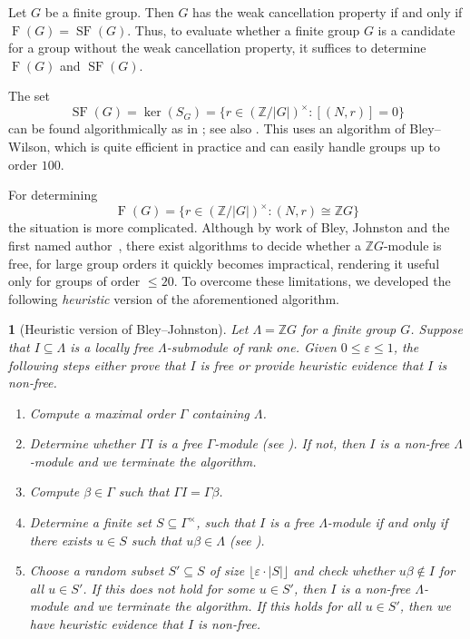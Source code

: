 \documentclass[11pt,leqno,a4paper]{amsart}
\newcommand{\Z}{\mathbb{Z}}
\DeclareMathOperator{\SF}{SF}
\DeclareMathOperator{\FF}{F}
\newcommand{\customthmname}{}
\newtheorem{innercustomthm}[thm]{\customthmname}
\newenvironment{customtheorem}[1]
  {\renewcommand{\customthmname}{#1}\begin{innercustomthm}}
  {\end{innercustomthm}}
\theoremstyle{definition}
\theoremstyle{remark}
\theoremstyle{custom}
\renewcommand{\l}{\Lambda}
\newenvironment{clist}[1]
{\begin{enumerate}[\normalfont #1]}
{\end{enumerate}}
\begin{document}
Let $G$ be a finite group.
Then $G$ has the weak cancellation property if and only if $\FF(G) = \SF(G)$.
Thus, to evaluate whether a finite group $G$ is a candidate for a group without the weak cancellation property, it suffices to determine $\FF(G)$ and $\SF(G)$.

The set
\[ \SF(G) = \ker(S_G) = \{ r \in (\Z/|G|)^\times : [(N,r)] = 0 \} \]
can be found algorithmically as
in ; see also .
This uses an algorithm of Bley--Wilson, which is quite efficient in practice and can easily handle groups up to order $100$.

For determining 
\[ \FF(G) = \{ r \in (\Z/|G|)^\times : (N,r) \cong \Z G\} \] 
the situation is more complicated.
Although by work of Bley, Johnston and the first named author~\cite{MR2422318,MR2813368,MR4136552}, there exist algorithms to decide whether a $\Z G$-module is free, for large group orders it quickly becomes impractical, rendering it useful only for groups of order $\leq 20$.
To overcome these limitations, we developed the following \textit{heuristic} version of the aforementioned algorithm.

\begin{customtheorem}{Algorithm}[Heuristic version of Bley--Johnston] \label{alg}
Let $\l = \Z G$ for a finite group $G$.
Suppose that $I \subseteq \l$ is a locally free $\l$-submodule of rank one.
Given $0 \leq \varepsilon \le 1$, the following steps either prove that $I$ is free or provide heuristic evidence that $I$ is non-free.
\begin{clist}{(1)}
\item
Compute a maximal order $\Gamma$ containing $\l$.
\item 
Determine whether $\Gamma I$ is a free $\Gamma$-module (see {\cite[\S{}5]{MR2813368}}).
If not, then $I$ is a non-free $\Lambda$-module and we terminate the algorithm.
\item 
Compute $\beta \in \Gamma$ such that $\Gamma I = \Gamma \beta$.
\item
Determine a finite set $S \subseteq \Gamma^\times$, such that $I$ is a free $\Lambda$-module if and only if there exists $u \in S$ such that $u\beta \in \Lambda$ (see {\cite[\S{}7]{MR2813368}}).
\item \label{item:heuristic}
Choose a random subset $S' \subseteq S$ of size $\lfloor \varepsilon \cdot |S| \rfloor$ and check whether $u \beta \not\in I$ for all $u \in S'$.
If this does not hold for some $u \in S'$, then $I$ is a non-free $\Lambda$-module and we terminate the algorithm. If this holds for all $u \in S'$, then we have heuristic evidence that $I$ is non-free.
\end{clist}
\end{customtheorem}
\end{document}
